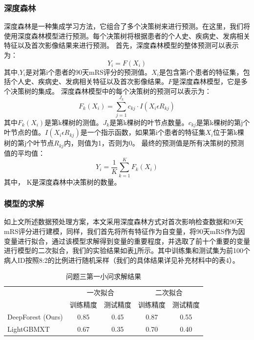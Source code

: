 \documentclass[bwprint]{gmcmthesis}
\begin{document}
\subsubsection{深度森林}
深度森林是一种集成学习方法，它组合了多个决策树来进行预测\cite{zhou2019deep}。在这里，我们将使用深度森林模型进行预测。每个决策树将根据患者的个人史、疾病史、发病相关特征以及首次影像结果来进行预测。
首先，深度森林模型的整体预测可以表示为：
\begin{equation}
Y_i = F(X_i)
\end{equation}
其中,$Y_i$是对第i个患者的90天mRS评分的预测值。$X_i$是包含第i个患者的特征集，包括个人史、疾病史、发病相关特征以及首次影像结果。$F$是深度森林模型，它是多个决策树的集成。
深度森林模型中的每个决策树的预测可以表示为：
\begin{equation}
F_k(X_i) = \sum_{j=1}^{J_k}c_{kj}·I(X_i\epsilon R_{kj})
\end{equation}
其中$F_k(X_i)$是第k棵树的测值。$J_k$是第k棵树的叶节点数量。$c_{kj}$是第k棵树的第j个叶节点的值。$I(X_i\epsilon R_{kj})$是一个指示函数，如果第i个患者的特征集$X_i$位于第k棵树的第j个叶节点$R_{kj}$内，则值为1，否则为0。
最终的预测值是所有决策树的预测值的平均值：
\begin{equation}
Y_i = \frac{1}{K}\sum_{k=1}^{K}F_k(X_i)
\end{equation}
其中， K是深度森林中决策树的数量。

\subsubsection{模型的求解}
如上文所述数据预处理方案，本文采用深度森林方式对首次影响检查数据和90天mRS评分进行建模，同样，我们首先将所有特征作为自变量，将90天mRS作为因变量进行拟合，通过该模型求解得到变量的重要程度，并选取了前十个重要的变量进行模型的二次拟合，我们的实验结果如表\ref{tab:q31}所示。其中训练集和测试集为前100个病人ID按照8:2的比例进行随机采样（我们的具体结果详见补充材料中的表4）。

\begin{table}[ht]
\centering
\caption{问题三第一小问求解结果}
\label{tab:q31}
\fontsize{11}{9}\selectfont
    \renewcommand\tabcolsep{6pt}
    {
\begin{tabular}{lcccc}
\toprule[1.2pt]
\multicolumn{1}{c}{\multirow{2}{*}{}} & \multicolumn{2}{c}{一次拟合} & \multicolumn{2}{c}{二次拟合} \\
\multicolumn{1}{c}{}                  & 训练精度        & 测试精度       & 训练精度        & 测试精度       \\ \hline

DeepForest (Ours)                      & 0.85        & 0.45       & 0.87        & 0.55       \\
LightGBMXT                            & 0.67        & 0.35       & 0.70         & 0.40        \\ \bottomrule[1.2pt]
\end{tabular}}
\end{table}
\end{document}
